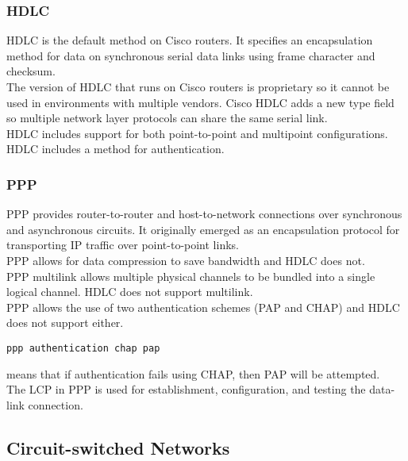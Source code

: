 \subsubsection{HDLC}

HDLC is the default method on Cisco routers. It specifies an encapsulation
method for data on synchronous serial data links using frame character and
checksum.\\

The version of HDLC that runs on Cisco routers is proprietary so it cannot
be used in environments with multiple vendors. Cisco HDLC adds a new type field
so multiple network layer protocols can share the same serial link.\\

HDLC includes support for both point-to-point and multipoint configurations.\\

HDLC includes a method for authentication.

\subsubsection{PPP}

PPP provides router-to-router and host-to-network connections over synchronous
and asynchronous circuits. It originally emerged as an encapsulation protocol
for transporting IP traffic over point-to-point links.\\

PPP allows for data compression to save bandwidth and HDLC does not.\\

PPP multilink allows multiple physical channels to be bundled into a single
logical channel. HDLC does not support multilink.\\

PPP allows the use of two authentication schemes (PAP and CHAP) and HDLC
does not support either.\\

\begin{verbatim}
ppp authentication chap pap
\end{verbatim}

means that if authentication fails using CHAP, then PAP will be attempted.\\

The LCP in PPP is used for establishment, configuration, and testing the
data-link connection.

\subsection{Circuit-switched Networks}

